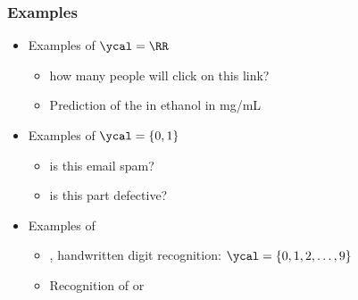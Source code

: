 \begin{frame}
  \frametitle{Examples}
  \begin{itemize}
  \item Examples of   $\ycal = \RR$ 
    \begin{itemize}
    \item {} how many people will click on this link?
    \item Prediction of the  in ethanol in mg/mL
    \end{itemize}
  \pause
  \item Examples of   $\ycal = \{0, 1\}$
    \begin{itemize}
    \item {} is this email spam?
    \item {} is this part defective?
    \end{itemize}
  \pause
  \item Examples of   
    \begin{itemize}
    \item {}, handwritten digit recognition: $\ycal = \{0, 1, 2, \dots, 9\}$
    \item Recognition of  or 
    \end{itemize} 
  \end{itemize}
\end{frame}

